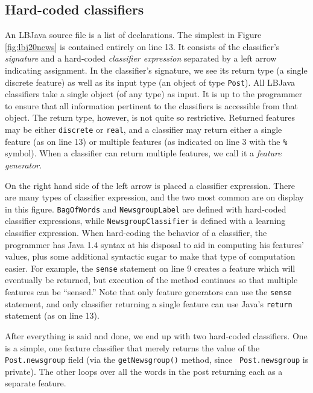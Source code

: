 \subsection{Hard-coded classifiers}

An LBJava source file is a list of declarations.  The simplest in Figure
\ref{fig:lbj20news} is contained entirely on line 13.  It consists of the
classifier's \emph{signature} and a hard-coded \emph{classifier expression}
separated by a left arrow indicating assignment.  In the classifier's
signature, we see its return type (a single discrete feature) as well as its
input type (an object of type {\tt Post}).  All LBJava classifiers take a single
object (of any type) as input.  It is up to the programmer to ensure that all
information pertinent to the classifiers is accessible from that object.  The
return type, however, is not quite so restrictive.  Returned features may be
either {\tt discrete} or {\tt real}, and a classifier may return either a
single feature (as on line 13) or multiple features (as indicated on line 3
with the {\tt \%} symbol).  When a classifier can return multiple features, we
call it a \emph{feature generator}.

On the right hand side of the left arrow is placed a classifier expression.
There are many types of classifier expression, and the two most common are on
display in this figure.  {\tt BagOfWords} and {\tt NewsgroupLabel} are defined
with hard-coded classifier expressions, while {\tt NewsgroupClassifier} is
defined with a learning classifier expression.  When hard-coding the behavior
of a classifier, the programmer has Java 1.4 syntax at his disposal to aid in
computing his features' values, plus some additional syntactic sugar to make
that type of computation easier.
%
%
For example, the {\tt sense} statement on line 9 creates a feature which will
eventually be returned, but execution of the method continues so that multiple
features can be ``sensed.''  Note that only feature generators can use the
{\tt sense} statement, and only classifier returning a single feature can use
Java's {\tt return} statement (as on line 13).

After everything is said and done, we end up with two hard-coded classifiers.
One is a simple, one feature classifier that merely returns the value of the
{\tt Post.newsgroup} field (via the {\tt getNewsgroup()} method, since {\tt
Post.newsgroup} is private).  The other loops over all the words in the post
returning each as a separate feature.

